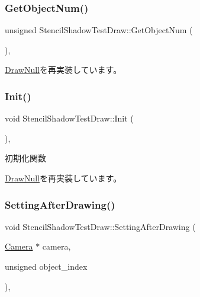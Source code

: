 \subsubsection{\texorpdfstring{Get\+Object\+Num()}{GetObjectNum()}}
{\footnotesize\ttfamily unsigned Stencil\+Shadow\+Test\+Draw\+::\+Get\+Object\+Num (\begin{DoxyParamCaption}{ }\end{DoxyParamCaption})\hspace{0.3cm}{\ttfamily [override]}, {\ttfamily [virtual]}}



\mbox{\hyperlink{class_draw_null_aaffa15d184f1d09512ccaa3bdad3f658}{Draw\+Null}}を再実装しています。

\mbox{\label{class_stencil_shadow_test_draw_a65be72e71cd12cacf315b0364c12c3e3}} 
\subsubsection{\texorpdfstring{Init()}{Init()}}
{\footnotesize\ttfamily void Stencil\+Shadow\+Test\+Draw\+::\+Init (\begin{DoxyParamCaption}{ }\end{DoxyParamCaption})\hspace{0.3cm}{\ttfamily [override]}, {\ttfamily [virtual]}}



初期化関数 



\mbox{\hyperlink{class_draw_null_acd7fef3ccea1da537ac9507ffbb6dd2e}{Draw\+Null}}を再実装しています。

\mbox{\label{class_stencil_shadow_test_draw_a68917115d3f151ed91ce297924ee5bbb}} 
\subsubsection{\texorpdfstring{Setting\+After\+Drawing()}{SettingAfterDrawing()}}
{\footnotesize\ttfamily void Stencil\+Shadow\+Test\+Draw\+::\+Setting\+After\+Drawing (\begin{DoxyParamCaption}\item[{\mbox{\hyperlink{class_camera}{Camera}} $\ast$}]{camera,  }\item[{unsigned}]{object\+\_\+index }\end{DoxyParamCaption})\hspace{0.3cm}{\ttfamily [override]}, {\ttfamily [virtual]}}



